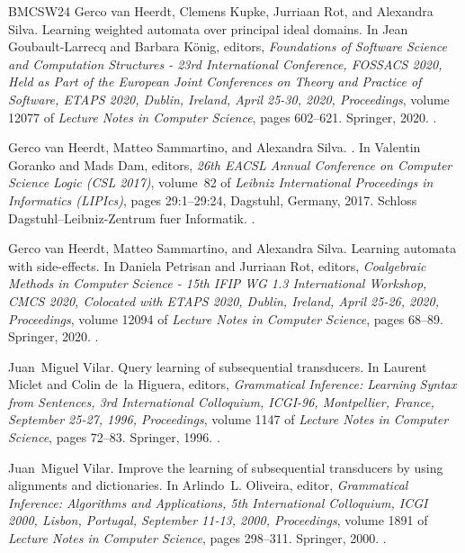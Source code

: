 \documentclass[10pt,a4paper]{amsart}
\theoremstyle{definition}
\numberwithin{equation}{section}
\numberwithin{theorem}{section}
\begin{document}
\begin{thebibliography}{BMCSW24}
Gerco van Heerdt, Clemens Kupke, Jurriaan Rot, and Alexandra Silva.
\newblock Learning weighted automata over principal ideal domains.
\newblock In Jean Goubault{-}Larrecq and Barbara K{\"{o}}nig, editors, {\em
  Foundations of Software Science and Computation Structures - 23rd
  International Conference, {FOSSACS} 2020, Held as Part of the European Joint
  Conferences on Theory and Practice of Software, {ETAPS} 2020, Dublin,
  Ireland, April 25-30, 2020, Proceedings}, volume 12077 of {\em Lecture Notes
  in Computer Science}, pages 602--621. Springer, 2020.
\newblock \href {https://doi.org/10.1007/978-3-030-45231-5\_31}
  {}.

Gerco van Heerdt, Matteo Sammartino, and Alexandra Silva.
.
\newblock In Valentin Goranko and Mads Dam, editors, {\em 26th EACSL Annual
  Conference on Computer Science Logic (CSL 2017)}, volume~82 of {\em Leibniz
  International Proceedings in Informatics (LIPIcs)}, pages 29:1--29:24,
  Dagstuhl, Germany, 2017. Schloss Dagstuhl--Leibniz-Zentrum fuer Informatik.
\newblock \href {https://doi.org/10.4230/LIPIcs.CSL.2017.29}
  {}.

Gerco van Heerdt, Matteo Sammartino, and Alexandra Silva.
\newblock Learning automata with side-effects.
\newblock In Daniela Petrisan and Jurriaan Rot, editors, {\em Coalgebraic
  Methods in Computer Science - 15th {IFIP} {WG} 1.3 International Workshop,
  {CMCS} 2020, Colocated with {ETAPS} 2020, Dublin, Ireland, April 25-26, 2020,
  Proceedings}, volume 12094 of {\em Lecture Notes in Computer Science}, pages
  68--89. Springer, 2020.
\newblock \href {https://doi.org/10.1007/978-3-030-57201-3\_5}
  {}.

Juan~Miguel Vilar.
\newblock Query learning of subsequential transducers.
\newblock In Laurent Miclet and Colin de~la Higuera, editors, {\em Grammatical
  Inference: Learning Syntax from Sentences, 3rd International Colloquium,
  ICGI-96, Montpellier, France, September 25-27, 1996, Proceedings}, volume
  1147 of {\em Lecture Notes in Computer Science}, pages 72--83. Springer,
  1996.
\newblock \href {https://doi.org/10.1007/BFb0033343}
  {}.

Juan~Miguel Vilar.
\newblock Improve the learning of subsequential transducers by using alignments
  and dictionaries.
\newblock In Arlindo~L. Oliveira, editor, {\em Grammatical Inference:
  Algorithms and Applications, 5th International Colloquium, {ICGI} 2000,
  Lisbon, Portugal, September 11-13, 2000, Proceedings}, volume 1891 of {\em
  Lecture Notes in Computer Science}, pages 298--311. Springer, 2000.
\newblock \href {https://doi.org/10.1007/978-3-540-45257-7\_24}
  {}.


\end{thebibliography}
\end{document}
